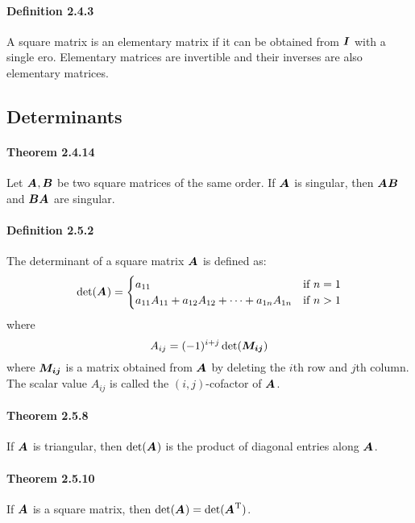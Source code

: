 \documentclass[a4paper]{article}
\begin{document}
\begin{multicols*}{3}
    \paragraph{Definition 2.4.3} A square matrix is an elementary matrix if it can be obtained from $\boldsymbol{I}$ with a single ero. Elementary matrices are invertible and their inverses are also elementary matrices.
    \subsection*{Determinants}
      \paragraph{Theorem 2.4.14} Let $\boldsymbol{A_{}}, \boldsymbol{B}$ be two square matrices of the same order. If $\boldsymbol{A_{}}$ is singular, then $\boldsymbol{A_{}}\boldsymbol{B}$ and $\boldsymbol{B}\boldsymbol{A_{}}$ are singular.
      \paragraph{Definition 2.5.2} The determinant of a  square matrix $\boldsymbol{A_{}}$ is defined as:
        \begin{equation*}
          \det(\boldsymbol{A_{}}) =
          \begin{cases}
            a_{11} & \text{if } n=1 \\
            a_{11}A_{11} + a_{12}A_{12} + \cdots + a_{1n}A_{1n} & \text{if } n>1
          \end{cases}
        \end{equation*}
        where
        \begin{equation*}
          A_{ij} = (-1)^{i+j}\det(\boldsymbol{M_{ij}})
        \end{equation*}
        where $\boldsymbol{M_{ij}}$ is a  matrix obtained from $\boldsymbol{A_{}}$ by deleting the $i$th row and $j$th column. The scalar value $A_{ij}$ is called the $(i,j)$-cofactor of $\boldsymbol{A_{}}$.
      \paragraph{Theorem 2.5.8} If $\boldsymbol{A_{}}$ is triangular, then $\det(\boldsymbol{A_{}})$ is the product of diagonal entries along $\boldsymbol{A_{}}$.
      \paragraph{Theorem 2.5.10} If $\boldsymbol{A_{}}$ is a square matrix, then $\det(\boldsymbol{A_{}}) = \det(\boldsymbol{A_{}}^{\text{T}})$.

\end{multicols*}
\end{document}
